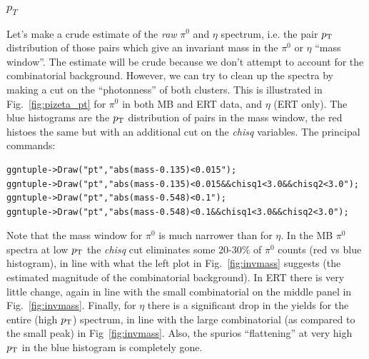 \documentclass[pdftex,12pt,letter]{article}
\newcommand{\piz}{\mbox{$\pi^0$}\xspace}
\newcommand{\pt}{\mbox{$p_{\rm T}$}\xspace}
\begin{document}
\subsubsection{\textbf{$p_T$}}
Let's make a crude estimate of the {\it raw} \piz and $\eta$ spectrum,
i.e. the pair \pt distribution of those pairs which give an invariant
mass in the \piz or $\eta$ ``mass window''.  The estimate will be
crude because we don't attempt to account for the combinatorial
background.  However, we can try to clean up the spectra by making a
cut on the ``photonness'' of both clusters.  This is illustrated in
Fig.~\ref{fig:pizeta_pt} for \piz in both MB and ERT data, and $\eta$
(ERT only).  The blue histograms are the \pt distribution of pairs in
the mass window, the red histoes the same but with an additional cut
on the {\it chisq} variables.  The principal commands:
\begin{lstlisting}
ggntuple->Draw("pt","abs(mass-0.135)<0.015");
ggntuple->Draw("pt","abs(mass-0.135)<0.015&&chisq1<3.0&&chisq2<3.0");
ggntuple->Draw("pt","abs(mass-0.548)<0.1");
ggntuple->Draw("pt","abs(mass-0.548)<0.1&&chisq1<3.0&&chisq2<3.0");
\end{lstlisting}
\noindent
Note that the mass window for \piz is much narrower than for $\eta$.
In the MB \piz spectra at low \pt the {\it chisq} cut eliminates 
some 20-30\% of \piz counts (red vs blue histogram), in line with what
the left plot in Fig.~\ref{fig:invmass} suggests (the estimated
magnitude of the combinatorial background).  In ERT there is very
little change, again in line with the small combinatorial on the
middle panel in Fig.~\ref{fig:invmass}.  Finally, for $\eta$ there is
a significant drop in the yields for the entire (high \pt) spectrum,
in line with the large combinatorial (as compared to the small peak)
in Fig~\ref{fig:invmass}.  Also, the spurios ``flattening'' at very
high \pt in the blue histogram is completely gone.
\end{document}
